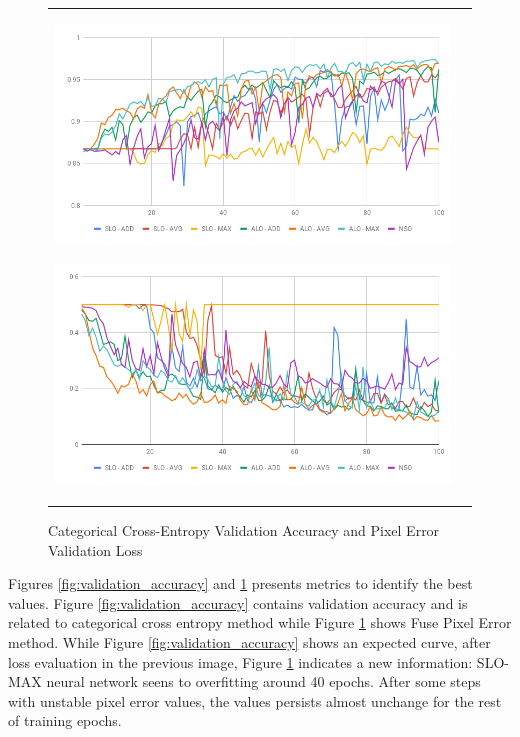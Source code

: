 \begin{figure}
  \caption{Categorical Cross-Entropy Validation Accuracy and Pixel Error Validation Loss}
  \centering
  \begin{tabular}{ll}
    \includegraphics[width=1.\columnwidth]{figures/falreis/validation_accuracy.png}
    \label{fig:validation_accuracy}
    
    \includegraphics[width=1.\columnwidth]{figures/falreis/pixel_error.png}
    \label{fig:pixel_error}
  \end{tabular}
\end{figure}

Figures \ref{fig:validation_accuracy} and \ref{fig:pixel_error} presents metrics to identify the best values. Figure \ref{fig:validation_accuracy} contains validation accuracy and is related to categorical cross entropy method while Figure \ref{fig:pixel_error} shows Fuse Pixel Error method. While Figure \ref{fig:validation_accuracy} shows an expected curve, after loss evaluation in the previous image, Figure \ref{fig:pixel_error} indicates a new information: SLO-MAX neural network seens to overfitting around 40 epochs. After some steps with unstable pixel error values, the values persists almost unchange for the rest of training epochs. 

